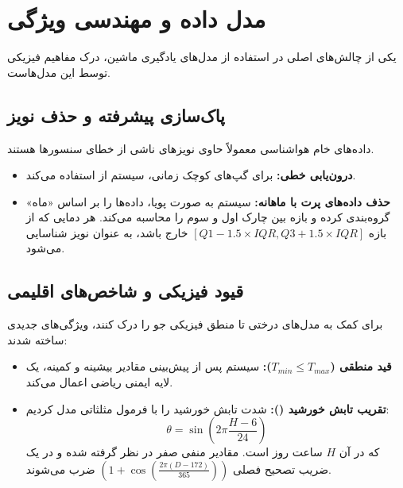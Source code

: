 \documentclass[12pt, a4paper]{article}
\newcommand{\code}[1]{\lr{\texttt{#1}}}
\begin{document}
	\section{مدل داده و مهندسی ویژگی}
	یکی از چالش‌های اصلی در استفاده از مدل‌های یادگیری ماشین، درک مفاهیم فیزیکی توسط این مدل‌هاست. 
	
	\subsection{پاک‌سازی پیشرفته و حذف نویز}
	داده‌های خام هواشناسی معمولاً حاوی نویزهای ناشی از خطای سنسورها هستند.
	\begin{itemize}
		\item \textbf{درون‌یابی خطی:} برای گپ‌های کوچک زمانی، سیستم از \code{zoo::na.approx} استفاده می‌کند.
		\item \textbf{حذف داده‌های پرت با  ماهانه:} سیستم به صورت پویا، داده‌ها را بر اساس «ماه» گروه‌بندی کرده و بازه بین چارک اول و سوم را محاسبه می‌کند. هر دمایی که از بازه $[Q1 - 1.5 \times IQR, Q3 + 1.5 \times IQR]$ خارج باشد، به عنوان نویز شناسایی می‌شود.
	\end{itemize}
	
	\subsection{قیود فیزیکی و شاخص‌های اقلیمی}
	برای کمک به مدل‌های درختی تا منطق فیزیکی جو را درک کنند، ویژگی‌های جدیدی ساخته شدند:
	\begin{itemize}
		\item \textbf{قید منطقی ($T_{min} \leq T_{max}$):} سیستم پس از پیش‌بینی مقادیر بیشینه و کمینه، یک لایه ایمنی ریاضی اعمال می‌کند.
		\item \textbf{تقریب تابش خورشید (\code{solar\_rad}):} شدت تابش خورشید را با فرمول مثلثاتی مدل کردیم:
		\begin{equation}
			\theta = \sin\left(2\pi \frac{H - 6}{24}\right)
		\end{equation}
		که در آن $H$ ساعت روز است. مقادیر منفی صفر در نظر گرفته شده و در یک ضریب تصحیح فصلی $\left(1 + \cos\left(\frac{2\pi (D - 172)}{365}\right)\right)$ ضرب می‌شوند.
	\end{itemize}
	
\end{document}
